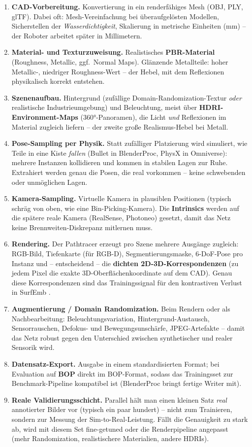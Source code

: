 \begin{enumerate}
\item \textbf{CAD-Vorbereitung.} Konvertierung in ein renderfähiges Mesh (OBJ,
  PLY, glTF). Dabei oft: Mesh-Vereinfachung bei überaufgelösten Modellen,
  Sicherstellen der \emph{Wasserdichtigkeit}, Skalierung in metrische Einheiten
  (mm) -- der Roboter arbeitet später in Millimetern.
\item \textbf{Material- und Texturzuweisung.} Realistisches \textbf{PBR-Material}
  (Roughness, Metallic, ggf.\ Normal Maps). Glänzende Metallteile: hoher
  Metallic-, niedriger Roughness-Wert -- der Hebel, mit dem Reflexionen
  physikalisch korrekt entstehen.
\item \textbf{Szenenaufbau.} Hintergrund (zufällige Domain-Randomization-Textur
  \emph{oder} realistische Industrieumgebung) und Beleuchtung, meist über
  \textbf{HDRI-Environment-Maps} (360°-Panoramen), die Licht \emph{und}
  Reflexionen im Material zugleich liefern -- der zweite große Realismus-Hebel
  bei Metall.
\item \textbf{Pose-Sampling per Physik.} Statt zufälliger Platzierung wird
  simuliert, wie Teile in eine Kiste \emph{fallen} (Bullet in BlenderProc,
  PhysX in Omniverse): mehrere Instanzen kollidieren und kommen in stabilen
  Lagen zur Ruhe. Extrahiert werden genau die Posen, die real vorkommen -- keine
  schwebenden oder unmöglichen Lagen.
\item \textbf{Kamera-Sampling.} Virtuelle Kamera in plausiblen Positionen
  (typisch schräg von oben, wie eine Bin-Picking-Kamera). Die
  \textbf{Intrinsics} werden auf die spätere reale Kamera (RealSense, Photoneo)
  gesetzt, damit das Netz keine Brennweiten-Diskrepanz mitlernen muss.
\item \textbf{Rendering.} Der Pathtracer erzeugt pro Szene mehrere Ausgänge
  zugleich: RGB-Bild, Tiefenkarte (für RGB-D), Segmentierungsmaske, 6-DoF-Pose
  pro Instanz und -- entscheidend -- die \textbf{dichten 2D-3D-Korrespondenzen}
  (zu jedem Pixel die exakte 3D-Oberflächenkoordinate auf dem CAD). Genau diese
  Korrespondenzen sind das Trainingssignal für den kontrastiven Verlust in
  SurfEmb \cite{haugaard2022surfemb}.
\item \textbf{Augmentierung / Domain Randomization.} Beim Rendern oder als
  Nachbearbeitung: Beleuchtungsvariation, Hintergrund-Austausch, Sensorrauschen,
  Defokus- und Bewegungsunschärfe, JPEG-Artefakte -- damit das Netz robust gegen
  den Unterschied zwischen synthetischer und realer Sensorik wird.
\item \textbf{Datensatz-Export.} Ausgabe in einem standardisierten Format; bei
  Evaluation auf \textbf{BOP} \cite{hodan2018bop} direkt im BOP-Format, sodass
  das Trainingsset zur Benchmark-Pipeline kompatibel ist (BlenderProc bringt
  fertige Writer mit).
\item \textbf{Reale Validierungsschicht.} Parallel hält man einen kleinen Satz
  \emph{real} annotierter Bilder vor (typisch ein paar hundert) -- nicht zum
  Trainieren, sondern zur Messung der Sim-to-Real-Leistung. Fällt die
  Genauigkeit zu stark ab, wird mit diesem Set fine-getuned oder die
  Renderpipeline angepasst (mehr Randomization, realistischere Materialien,
  andere HDRIs).
\end{enumerate}

